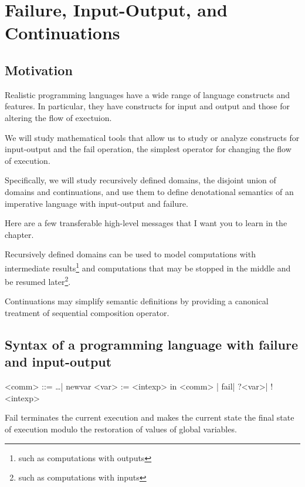 \chapter{Failure, Input-Output, and Continuations} \label{ch:failure}

\section{Motivation}

\begin{enumcirc}
	\item
	Realistic programming languages have a wide range of language constructs and
	features.
	In particular, they have constructs for input and output and those for altering
	the flow of exectuion.
	\item
	We will study mathematical tools that allow us to study or analyze constructs
	for input-output and the fail operation, the simplest operator for changing the
	flow of execution.
	\item
	Specifically, we will study recursively defined domains, the disjoint union of
	domains and continuations, and use them to define denotational semantics of an
	imperative language with input-output and failure.
	\item
	Here are a few transferable high-level messages that I want you to learn in the
	chapter.
	\begin{enumrm}
		\item
		Recursively defined domains can be used to model computations with intermediate
		results\footnote{such as computations with outputs}
		and computations that may be stopped in the middle and be resumed
		later\footnote{such as computations with inputs}.
		\item
		Continuations may simplify semantic definitions by providing a canonical
		treatment of sequential composition operator.
	\end{enumrm}
\end{enumcirc}

\section{Syntax of a programming language with failure and input-output}

\begin{center}
	\begin{minipage}{0.9\textwidth}
		\begin{grammar}
			<comm> ::= \dots | newvar <var> := <intexp> in <comm> | fail\footnotemark | ?<var>\footnotemark | !<intexp>\footnotemark
		\end{grammar}
	\end{minipage}
\end{center}
%
Fail terminates the current execution and makes the current state the final
state of execution modulo the restoration of values of global variables.

